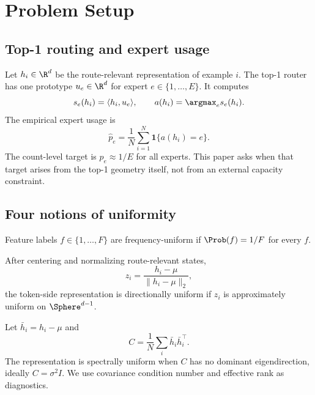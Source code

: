 \section{Problem Setup}

\subsection{Top-1 routing and expert usage}

Let $h_i\in\R^d$ be the route-relevant representation of example $i$. The
top-1 router has one prototype $u_e\in\R^d$ for expert
$e\in\{1,\ldots,E\}$. It computes
\begin{equation}
 s_e(h_i)=\langle h_i,u_e\rangle,
 \qquad
 a(h_i)=\argmax_e s_e(h_i).
\end{equation}
The empirical expert usage is
\begin{equation}
 \widehat p_e=\frac{1}{N}\sum_{i=1}^N \mathbf{1}\{a(h_i)=e\}.
\end{equation}
The count-level target is $\widehat p_e\approx 1/E$ for all experts. This paper
asks when that target arises from the top-1 geometry itself, not from an
external capacity constraint.

\subsection{Four notions of uniformity}

\begin{definition}
Feature labels $f\in\{1,\ldots,F\}$ are frequency-uniform if
$\Prob(f)=1/F$ for every $f$.
\end{definition}

\begin{definition}
After centering and normalizing route-relevant states,
\begin{equation}
 z_i=\frac{h_i-\mu}{\|h_i-\mu\|_2},
\end{equation}
the token-side representation is directionally uniform if $z_i$ is
approximately uniform on $\Sphere^{d-1}$.
\end{definition}

\begin{definition}
Let $\bar h_i=h_i-\mu$ and
\begin{equation}
 C=\frac{1}{N}\sum_i \bar h_i\bar h_i^\top.
\end{equation}
The representation is spectrally uniform when $C$ has no dominant
eigendirection, ideally $C=\sigma^2 I$. We use covariance condition number and
effective rank as diagnostics.
\end{definition}

